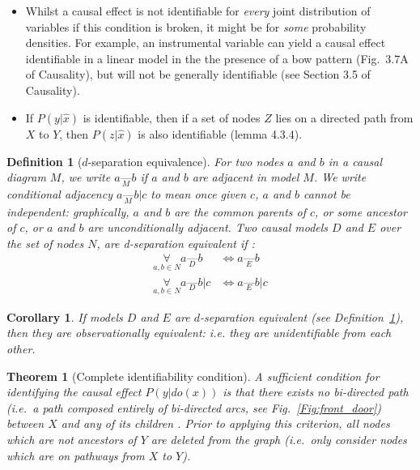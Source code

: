 \documentclass[11pt]{article}
\numberwithin{equation}{section}
\newtheorem{thm}{Theorem}[section]
\newtheorem{defn}{Definition}[section]
\newtheorem{cor}{Corollary}[section]
\begin{document}
\begin{itemize}
\item Whilst a causal effect is not identifiable for \textit{every} joint distribution of variables if this condition is broken, it might be for \textit{some} probability densities. For example, an instrumental variable can yield a causal effect identifiable in a linear model in the the presence of a bow pattern (Fig.~3.7A of Causality), but will not be generally identifiable (see Section 3.5 of Causality).
\item If $P(y|\hat{x})$ is identifiable, then if a set of nodes $Z$ lies on a directed path from $X$ to $Y$, then $P(z|\hat{x})$ is also identifiable (lemma 4.3.4).
\end{itemize}

\begin{defn}[$d$-separation equivalence] \label{defn:d-sep-equiv}
For two nodes $a$ and $b$ in a causal diagram $M$, we write $a \underset{M}{\text{---}} b$ if $a$ and $b$ are adjacent in model $M$. We write conditional adjacency $a \underset{M}{\text{---}} b | c$ to mean once given $c$, $a$ and $b$ cannot be independent: graphically, $a$ and $b$ are the common parents of $c$, or some ancestor of $c$, or $a$ and $b$ are unconditionally adjacent.  Two causal models $D$ and $E$ over the set of nodes $N$, are d-separation equivalent if \citep{Verma88}:
\begin{align}
\underset{a,b \in N}{\forall} a \underset{D}{\text{---}} b &\iff a \underset{E}{\text{---}} b \\
\underset{a,b \in N}{\forall} a \underset{D}{\text{---}} b | c &\iff a \underset{E}{\text{---}} b | c
\end{align}
\end{defn}

\begin{cor}\label{cor:d-sep-equiv-thm}
If models $D$ and $E$ are $d$-separation equivalent (see Definition~\ref{defn:d-sep-equiv}), then they are observationally equivalent: i.e. they are unidentifiable from each other. 
\end{cor}

\begin{thm}[Complete identifiability condition]
A sufficient condition for identifying the causal effect $P(y|do(x))$ is that there exists no bi-directed path (i.e.\ a path composed entirely of bi-directed arcs, see Fig.~\ref{Fig:front_door}) between $X$ and any of its children \citep{Tian02}. Prior to applying this criterion, all nodes which are not ancestors of $Y$ are deleted from the graph (i.e.\ only consider nodes which are on pathways from $X$ to $Y$).
\end{thm}
\end{document}
